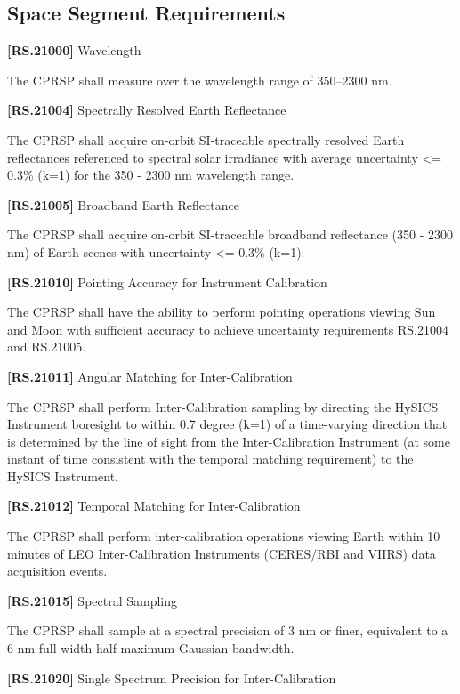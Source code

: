 \subsection{Space Segment Requirements}
\label{spacesegmentrequirements}

\textbf{[RS.21000]} Wavelength

The \gls{CPRSP} shall \gls{measure} over the wavelength range of 350--2300 nm.

\textbf{[RS.21004]} Spectrally Resolved Earth Reflectance

The \gls{CPRSP} shall acquire on-orbit \gls{SI}-traceable spectrally resolved Earth reflectances referenced to spectral solar irradiance with average uncertainty <= 0.3\% (k=1) for the 350 - 2300 nm wavelength range.

\textbf{[RS.21005]} Broadband Earth Reflectance

The \gls{CPRSP} shall acquire on-orbit \gls{SI}-traceable broadband reflectance (350 - 2300 nm) of Earth scenes with uncertainty <= 0.3\% (k=1).

\textbf{[RS.21010]} Pointing Accuracy for Instrument Calibration

The \gls{CPRSP} shall have the ability to perform \gls{point}ing operations viewing Sun and Moon with sufficient accuracy to achieve uncertainty requirements \gls{RS}.21004 and \gls{RS}.21005.

\textbf{[RS.21011]} Angular Matching for Inter-Calibration

The \gls{CPRSP} shall perform Inter-Calibration sampling by directing the \gls{HySICS} Instrument boresight to within 0.7 degree (k=1) of a time-varying direction that is determined by the line of sight from the Inter-Calibration Instrument (at some instant of time consistent with the temporal matching requirement) to the \gls{HySICS} Instrument.

\textbf{[RS.21012]} Temporal Matching for Inter-Calibration

The \gls{CPRSP} shall perform inter-calibration operations viewing Earth within 10 minutes of \gls{LEO} Inter-Calibration Instruments (CERES\slash RBI and VIIRS) data acquisition events.

\textbf{[RS.21015]} Spectral Sampling

The \gls{CPRSP} shall \gls{sample} at a spectral precision of 3 nm or finer, equivalent to a 6 nm full width half maximum Gaussian bandwidth.

\textbf{[RS.21020]} Single Spectrum Precision for Inter-Calibration

